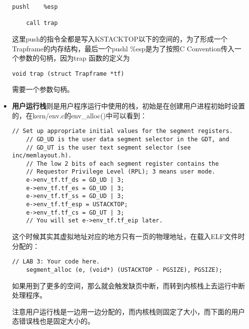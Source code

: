 \documentclass{article}
\newcommand{\highlight}[1]{{\bfseries \color{red}  #1}}
\newcommand{\funcname}[1]{{\ttfamily \small #1}}
\begin{document}
\begin{CJK*}{UTF8}{gkai}
\begin{itemize}
{\begin{lstlisting}[style=acode, title={\scriptsize \ttfamily \bfseries kern/trapentry.S}]
    pushl    %esp

    call trap
\end{lstlisting}

这里push的指令全都是写入KSTACKTOP以下的空间的，为了形成一个Trapframe的内存结构，最后一个pushl \%esp是为了按照C Convention传入一个参数的句柄，因为trap 函数的定义为

\begin{lstlisting}[style=ccode, title={\scriptsize \ttfamily \bfseries kern/trap.c}]
void trap (struct Trapframe *tf) 
\end{lstlisting}

需要一个参数句柄。
}
\item{\highlight{用户运行栈}则是用户程序运行中使用的栈，初始是在创建用户进程初始时设置的，在kern/env.c的\funcname{env\_alloc()}中可以看到：

\begin{lstlisting}[style=ccode, title={\scriptsize \ttfamily \bfseries kern/env.c: env\_alloc()}]
	// Set up appropriate initial values for the segment registers.
	// GD_UD is the user data segment selector in the GDT, and 
	// GD_UT is the user text segment selector (see inc/memlayout.h).
	// The low 2 bits of each segment register contains the
	// Requestor Privilege Level (RPL); 3 means user mode.
	e->env_tf.tf_ds = GD_UD | 3;
	e->env_tf.tf_es = GD_UD | 3;
	e->env_tf.tf_ss = GD_UD | 3;
	e->env_tf.tf_esp = USTACKTOP;
	e->env_tf.tf_cs = GD_UT | 3;
	// You will set e->env_tf.tf_eip later.
\end{lstlisting}

这个时候其实其虚拟地址对应的地方只有一页的物理地址，在载入ELF文件时分配的：

\begin{lstlisting}[style=ccode, title={\scriptsize \ttfamily \bfseries kern/env.c: load\_icode()}]
    // LAB 3: Your code here.
    segment_alloc (e, (void*) (USTACKTOP - PGSIZE), PGSIZE);
\end{lstlisting}

如果用到了更多的空间，那么就会触发缺页中断，而转到内核栈上去运行中断处理程序。

注意用户运行栈是一边用一边分配的，而内核栈则固定了大小，而下面的用户态错误栈也是固定大小的。
}


\end{itemize}
\end{CJK*}
\end{document}
